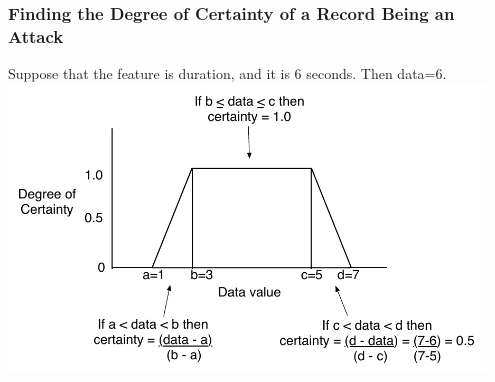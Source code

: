\documentclass{beamer}
\newcommand{\linespace}{\vskip 0.25cm}
\begin{document}
\begin{frame}
  \frametitle{Finding the Degree of Certainty of a Record Being an Attack}
	Suppose that the feature is duration, and it is 6 seconds. Then data=6.
  \includegraphics[width=0.95\textwidth]{../trapFigExample.pdf}


\end{frame}
\end{document}
